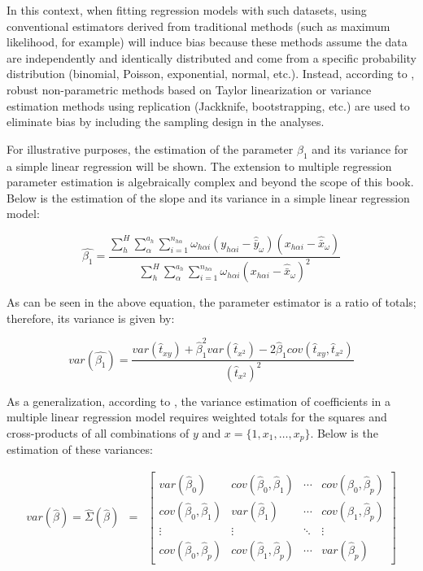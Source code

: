 \documentclass[
  12pt,
]{book}
\begin{document}
In this context, when fitting regression models with such datasets, using conventional estimators derived from traditional methods (such as maximum likelihood, for example) will induce bias because these methods assume the data are independently and identically distributed and come from a specific probability distribution (binomial, Poisson, exponential, normal, etc.). Instead, according to \citet{Wolter_2007}, robust non-parametric methods based on Taylor linearization or variance estimation methods using replication (Jackknife, bootstrapping, etc.) are used to eliminate bias by including the sampling design in the analyses.

For illustrative purposes, the estimation of the parameter \(\beta_{1}\) and its variance for a simple linear regression will be shown. The extension to multiple regression parameter estimation is algebraically complex and beyond the scope of this book. Below is the estimation of the slope and its variance in a simple linear regression model:

\[
\hat{\beta_{1}}  =  \frac{{\sum_{h}^{H}\sum_{\alpha}^{a_{h}}\sum_{i=1}^{n_{h\alpha}}\omega_{h\alpha i}\left(y_{h\alpha i}-\hat{\bar{y}}_{\omega}\right)\left(x_{h\alpha i}-\hat{\bar{x}}_{\omega}\right)}}{{ \sum_{h}^{H}\sum_{\alpha}^{a_{h}}\sum_{i=1}^{n_{h\alpha}}\omega_{h\alpha i}\left(x_{h\alpha i}-\hat{\bar{x}}_{\omega}\right)^{2}}}
\]

As can be seen in the above equation, the parameter estimator is a ratio of totals; therefore, its variance is given by:

\[
var\left(\hat{\beta_{1}}\right)  =  \frac{var\left(\hat{t}_{xy}\right)+\hat{\beta}_{1}^{2}var\left(\hat{t}_{x^{2}}\right)-2\hat{\beta}_{1}cov\left(\hat{t}_{xy},\hat{t}_{x^{2}}\right)}{\left(\hat{t}_{x^{2}}\right)^{2}}
\]

As a generalization, according to \citet{kish1974inference}, the variance estimation of coefficients in a multiple linear regression model requires weighted totals for the squares and cross-products of all combinations of \(y\) and \(x = \{1, x_{1}, \ldots, x_{p}\}\). Below is the estimation of these variances:

\begin{eqnarray*}
var\left(\hat{\beta}\right)=\hat{\Sigma}\left(\hat{\beta}\right) & = & \left[\begin{array}{cccc}
var\left(\hat{\beta}_{0}\right) & cov\left(\hat{\beta}_{0},\hat{\beta}_{1}\right) & \cdots & cov\left(\hat{\beta}_{0},\hat{\beta}_{p}\right)\\
cov\left(\hat{\beta}_{0},\hat{\beta}_{1}\right) & var\left(\hat{\beta}_{1}\right) & \cdots & cov\left(\hat{\beta}_{1},\hat{\beta}_{p}\right)\\
\vdots & \vdots & \ddots & \vdots\\
cov\left(\hat{\beta}_{0},\hat{\beta}_{p}\right) & cov\left(\hat{\beta}_{1},\hat{\beta}_{p}\right) & \cdots & var\left(\hat{\beta}_{p}\right)
\end{array}\right]
\end{eqnarray*}
\end{document}

